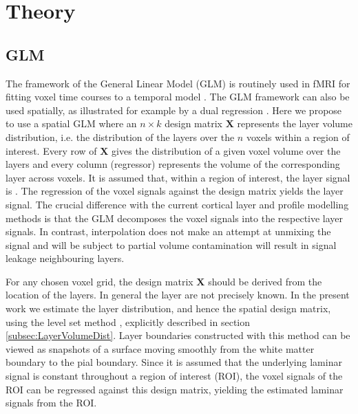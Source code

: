 \section{Theory}

\subsection{GLM}
The framework of the General Linear Model (GLM) is routinely used in fMRI for fitting voxel time courses to a temporal model \cite{Friston1994}. The GLM framework can also be used spatially, as illustrated for example by a dual regression \cite{Beckmann2009}. Here we propose to use a spatial GLM where an $n \times k$ design matrix $\mathbf{X}$ represents the layer volume distribution, i.e. the distribution of the  layers over the $n$ voxels within a region of interest. Every row of $\mathbf{X}$ gives the distribution of a given voxel volume over the layers and every column (regressor) represents the volume of the corresponding layer across voxels. It is assumed that, within a region of interest, the layer signal is . The regression of the voxel signals against the design matrix yields the layer signal.
The crucial difference with the current cortical layer and profile modelling methods is that the GLM decomposes the voxel signals into the respective layer signals. In contrast, interpolation does not make an attempt at unmixing the signal and will be subject to partial volume contamination  will result in signal leakage  neighbouring layers. 

For any chosen voxel grid, the design matrix $\mathbf{X}$ should be derived from the location of the layers.  In general the layer  are not precisely known. In the present work we estimate the layer distribution, and hence the spatial design matrix, using the level set method  \cite{Waehnert2014}, explicitly described in section \ref{subsec:LayerVolumeDist}. Layer boundaries constructed with this method can be viewed as snapshots of a surface moving smoothly from the white matter boundary to the pial boundary. Since it is assumed that the underlying laminar signal is constant throughout a region of interest (ROI), the voxel signals of the ROI can be regressed against this design matrix, yielding the estimated laminar signals from the ROI. 

